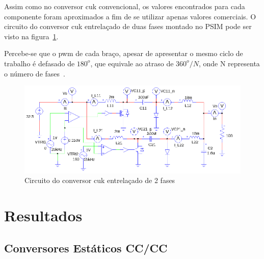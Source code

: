 \documentclass[
	12pt,				%
	openright,			%
	onseside,
	a4paper,			%
	english,			%
	french,				%
	spanish,			%
	brazil,				%
	]{abntex2}
\begin{document}
Assim como no conversor cuk convencional, os valores encontrados para cada componente foram aproximados a fim de se utilizar apenas valores comerciais. O circuito do conversor cuk entrelaçado de duas fases montado no PSIM pode ser visto na figura~\ref{fig:interv_cuk_conv_psim_circuit}.

Percebe-se que o pwm de cada braço, apesar de apresentar o mesmo ciclo de trabalho é defasado de $180^o$, que equivale ao atraso de $360^o/N$, onde N representa o número de fases~\cite{JOSEPH_2015_Intervealed_CUK}.

\begin{figure}[htbp]%
	\begin{center}%
		\includegraphics[width=0.75 \linewidth]{interv_cuk_psim_circ}
		\caption{Circuito do conversor cuk entrelaçado de 2 fases}
		\label{fig:interv_cuk_conv_psim_circuit}
	\end{center}
\end{figure}


\chapter{Resultados}

\section{Conversores Estáticos CC/CC}
\end{document}
